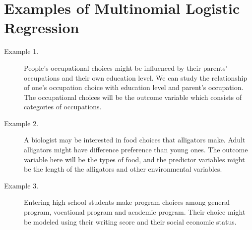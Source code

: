 \documentclass[a4paper,12pt]{article}
\begin{document}

\newpage
\section*{Examples of Multinomial Logistic Regression}

\begin{description}
	\item[Example 1.] People's occupational choices might be influenced by their parents' occupations and their own education level. We can study the relationship of one's occupation choice with education level and parent's occupation.  The occupational choices will be the outcome variable which consists of categories of occupations.
	
	\item[Example 2.] A biologist may be interested in food choices that alligators make. Adult alligators might have difference preference than young ones. The outcome variable here will be the types of food, and the predictor variables might be the length of the alligators and other environmental variables.
	
	\item[Example 3.] Entering high school students make program choices among general program, vocational program and academic program. Their choice might be modeled using their writing score and their social economic status.
\end{description}

\end{document}
